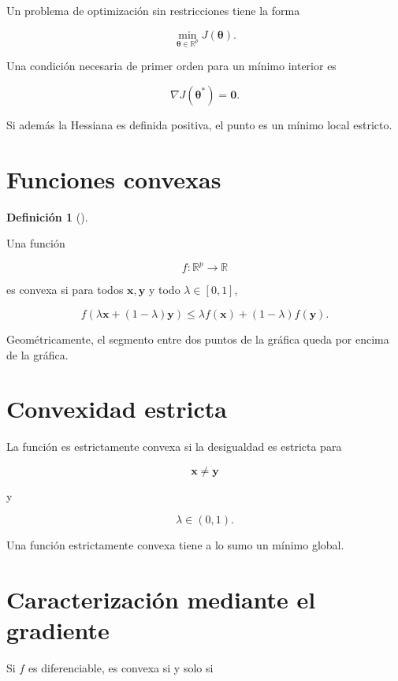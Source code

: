 \documentclass[
  spanish,
  11pt,
  letterpaper,
  DIV=11,
  numbers=noendperiod]{scrreprt}
\theoremstyle{definition}
\newtheorem{definition}{Definición}[chapter]
\theoremstyle{plain}
\theoremstyle{definition}
\theoremstyle{remark}
\begin{document}
Un problema de optimización sin restricciones tiene la forma

\[
\min_{\boldsymbol{\theta}\in\mathbb{R}^{p}}
J(\boldsymbol{\theta}).
\]

Una condición necesaria de primer orden para un mínimo interior es

\[
\nabla J(\boldsymbol{\theta}^{*})=\mathbf{0}.
\]

Si además la Hessiana es definida positiva, el punto es un mínimo local
estricto.

\section{Funciones convexas}\label{funciones-convexas}

\begin{definition}[]\protect\hypertarget{def-convexidad}{}\label{def-convexidad}

Una función

\[
f:\mathbb{R}^{p}\to\mathbb{R}
\]

es convexa si para todos \(\mathbf{x},\mathbf{y}\) y todo
\(\lambda\in[0,1]\),

\[
f(
\lambda\mathbf{x}
+
(1-\lambda)\mathbf{y}
)
\leq
\lambda f(\mathbf{x})
+
(1-\lambda)f(\mathbf{y}).
\]

\end{definition}

Geométricamente, el segmento entre dos puntos de la gráfica queda por
encima de la gráfica.

\section{Convexidad estricta}\label{convexidad-estricta}

La función es estrictamente convexa si la desigualdad es estricta para

\[
\mathbf{x}\neq\mathbf{y}
\]

y

\[
\lambda\in(0,1).
\]

Una función estrictamente convexa tiene a lo sumo un mínimo global.

\section{Caracterización mediante el
gradiente}\label{caracterizaciuxf3n-mediante-el-gradiente}

Si \(f\) es diferenciable, es convexa si y solo si
\end{document}

